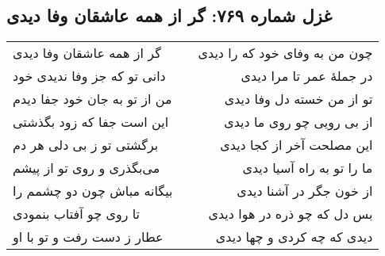\begin{center}
\section*{غزل شماره ۷۶۹: گر از همه عاشقان وفا دیدی}
\label{sec:769}
\begin{longtable}{l p{0.5cm} r}
گر از همه عاشقان وفا دیدی
&&
چون من به وفای خود که را دیدی
\\
دانی تو که جز وفا ندیدی خود
&&
در جملهٔ عمر تا مرا دیدی
\\
من از تو به جان خود جفا دیدم
&&
تو از من خسته دل وفا دیدی
\\
این است جفا که زود بگذشتی
&&
از بی رویی چو روی ما دیدی
\\
برگشتی تو ز بی دلی هر دم
&&
این مصلحت آخر از کجا دیدی
\\
می‌بگذری و روی تو از پیشم
&&
ما را تو به راه آسیا دیدی
\\
بیگانه مباش چون دو چشمم را
&&
از خون جگر در آشنا دیدی
\\
تا روی چو آفتاب بنمودی
&&
بس دل که چو ذره در هوا دیدی
\\
عطار ز دست رفت و تو با او
&&
دیدی که چه کردی و چها دیدی
\\
\end{longtable}
\end{center}
